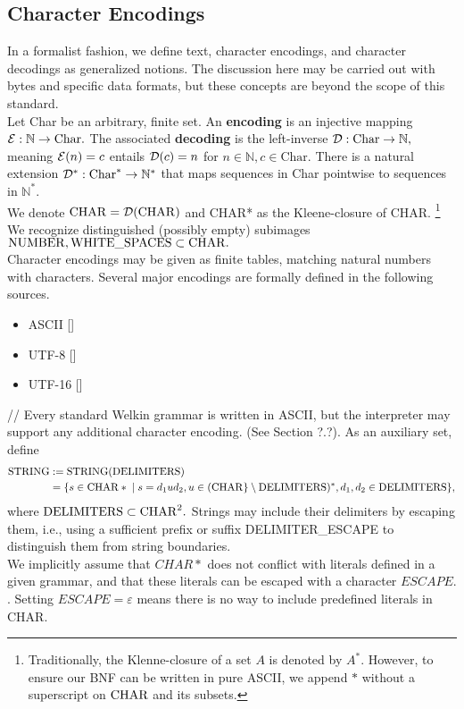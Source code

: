 \subsection{Character Encodings}
In a formalist fashion, we define text, character encodings, and character decodings as generalized notions. The discussion here may be carried out with bytes and specific data formats, but these concepts are beyond the scope of this standard.
\\ Let Char be an arbitrary, finite set. An \textbf{encoding} is an injective mapping $\mathcal{E} : \mathbb{N} \to \textrm{Char}.$ The associated \textbf{decoding} is the left-inverse $\mathcal{D}: \mathrm{Char} \to \mathbb{N},$ meaning $\mathcal{E}(n) = c$ entails $\mathcal{D}(c) = n$ for $n \in \mathbb{N}, c \in \textrm{Char}.$ There is a natural extension $\mathcal{D}^{*}: \textrm{Char}^{*} \to \mathbb{N}^{*}$
that maps sequences in Char pointwise to sequences in $\mathbb{N}^{*}.$
\\ We denote $\mathrm{CHAR} = \mathcal{D}(\mathrm{CHAR})$ and CHAR* as the Kleene-closure of CHAR.
\footnote{Traditionally, the Klenne-closure of a set $A$ is denoted by $A^{*}.$ However, to ensure our BNF
can be written in pure ASCII, we append $*$ without a superscript on $\mathrm{CHAR}$ and its subsets.}
We recognize distinguished (possibly empty) subimages $\mathrm{NUMBER}, \mathrm{WHITE\_SPACES} \subset \mathrm{CHAR}.$ %
\\ Character encodings may be given as finite tables, matching natural numbers with characters. Several major encodings are formally defined in the following sources.
\begin{itemize}
	\item ASCII []
	\item UTF-8 []
	\item UTF-16 []
\end{itemize}
// Every standard Welkin grammar is written in ASCII, but the interpreter may support any additional character encoding. (See Section ?.?).
As an auxiliary set, define
\begin{align*}
	\mathrm{STRING} &:= \mathrm{STRING}(\mathrm{DELIMITERS}) \\ &= \{s \in \mathrm{CHAR}* \;|\; s = d_{1} u d_{2}, u \in (\mathrm{CHAR}\} \setminus \mathrm{DELIMITERS})^{*}, d_{1}, d_{2} \in \mathrm{DELIMITERS}\},\end{align*}
where $\mathrm{DELIMITERS} \subset \mathrm{CHAR}^{2}.$
Strings may include their delimiters by escaping them, i.e., using a sufficient prefix or suffix DELIMITER\_ESCAPE to distinguish them from string boundaries.
\\ We implicitly assume that $CHAR*$ does not conflict with literals defined in a given grammar, and that these literals can be escaped with a character $ESCAPE.$. Setting $ESCAPE = \varepsilon$ means there is no way to include predefined literals in CHAR.

